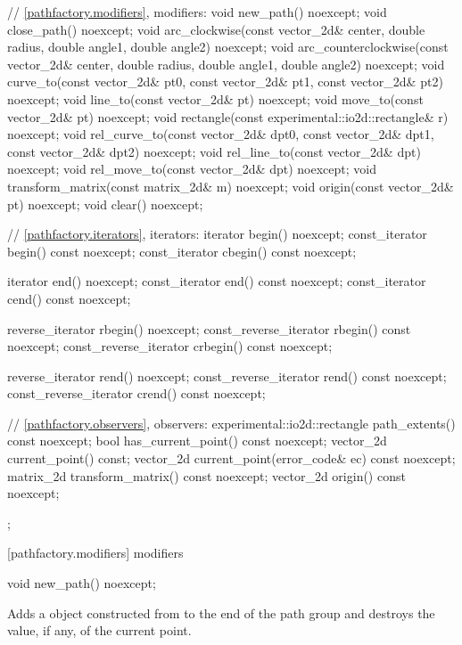 \begin{codeblock}
{{{{{    // \ref{pathfactory.modifiers}, modifiers:
    void new_path() noexcept;
    void close_path() noexcept;
    void arc_clockwise(const vector_2d& center, double radius, double angle1,
      double angle2) noexcept;
    void arc_counterclockwise(const vector_2d& center, double radius,
      double angle1, double angle2) noexcept;
    void curve_to(const vector_2d& pt0, const vector_2d& pt1,
      const vector_2d& pt2) noexcept;
    void line_to(const vector_2d& pt) noexcept;
    void move_to(const vector_2d& pt) noexcept;
    void rectangle(const experimental::io2d::rectangle& r) noexcept;
    void rel_curve_to(const vector_2d& dpt0, const vector_2d& dpt1,
      const vector_2d& dpt2) noexcept;
    void rel_line_to(const vector_2d& dpt) noexcept;
    void rel_move_to(const vector_2d& dpt) noexcept;
    void transform_matrix(const matrix_2d& m) noexcept;
    void origin(const vector_2d& pt) noexcept;
    void clear() noexcept;

    // \ref{pathfactory.iterators}, iterators:
    iterator begin() noexcept;
    const_iterator begin() const noexcept;
    const_iterator cbegin() const noexcept;

    iterator end() noexcept;
    const_iterator end() const noexcept;
    const_iterator cend() const noexcept;
    
    
    reverse_iterator rbegin() noexcept;
    const_reverse_iterator rbegin() const noexcept;
    const_reverse_iterator crbegin() const noexcept;

    reverse_iterator rend() noexcept;
    const_reverse_iterator rend() const noexcept;
    const_reverse_iterator crend() const noexcept;

    
    // \ref{pathfactory.observers}, observers:
    experimental::io2d::rectangle path_extents() const noexcept;
    bool has_current_point() const noexcept;
    vector_2d current_point() const;
    vector_2d current_point(error_code& ec) const noexcept;
    matrix_2d transform_matrix() const noexcept;
    vector_2d origin() const noexcept;
  };
} } } }
\end{codeblock}

 [pathfactory.modifiers] { modifiers}

\begin{itemdecl}
    void new_path() noexcept;
\end{itemdecl}
\begin{itemdescr}
	\pnum
	\effects
	Adds a  object constructed from  to the end of the path group and destroys the value, if any, of the current point.
\end{itemdescr}

